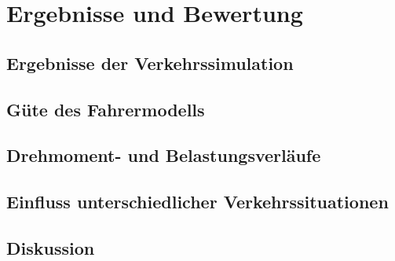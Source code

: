 \chapter{Ergebnisse und Bewertung}

\section{Ergebnisse der Verkehrssimulation}

\section{Güte des Fahrermodells}

\section{Drehmoment- und Belastungsverläufe}

\section{Einfluss unterschiedlicher Verkehrssituationen}

\section{Diskussion}
